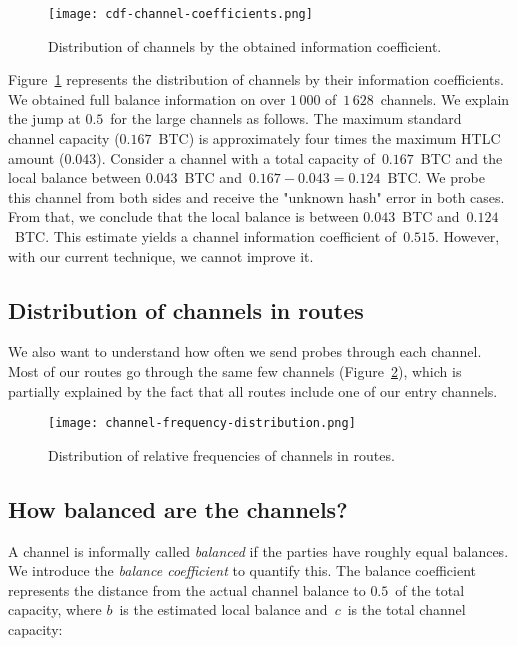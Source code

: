 \begin{figure}[ht]
	\centering
	\texttt{[image: cdf-channel-coefficients.png]}
	\caption{Distribution of channels by the obtained information coefficient.}
	\label{fig:cdf-channel-coefficients}
\end{figure}

Figure~\ref{fig:cdf-channel-coefficients} represents the distribution of channels by their information coefficients.
We obtained full balance information on over $1\,000$ of~$1\,628$~channels.
We explain the jump at $0.5$~for the large channels as follows.
The maximum standard channel capacity ($0.167$~BTC) is approximately four times the maximum HTLC amount ($0.043$).
Consider a channel with a total capacity of~$0.167$~BTC and the local balance between $0.043$~BTC and~$0.167 - 0.043 = 0.124$~BTC\@.
We probe this channel from both sides and receive the "unknown hash" error in both cases.
From that, we conclude that the local balance is between $0.043$~BTC and~$0.124$~BTC\@.
This estimate yields a channel information coefficient of~$0.515$.
However, with our current technique, we cannot improve it.

\subsection{Distribution of channels in routes}

We also want to understand how often we send probes through each channel.
Most of our routes go through the same few channels (Figure~\ref{fig:channel-frequency-distribution}), which is partially explained by the fact that all routes include one of our entry channels.

\begin{figure}[h]
	\centering
	\texttt{[image: channel-frequency-distribution.png]}
	\caption{Distribution of relative frequencies of channels in routes.}
	\label{fig:channel-frequency-distribution}
\end{figure}


\subsection{How balanced are the channels?}

A channel is informally called \textit{balanced} if the parties have roughly equal balances.
We introduce the \textit{balance coefficient} to quantify this.
The balance coefficient represents the distance from the actual channel balance to $0.5$~of the total capacity, where $b$~is the estimated local balance and~$c$~is the total channel capacity:

